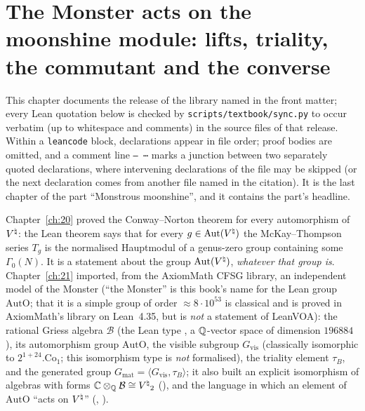 \chapter{The Monster acts on the moonshine module: lifts, triality, the commutant and the converse}\label{ch:22}

\providecommand{\chtwentytwoM}{\mathbb{M}}
\providecommand{\chtwentytwoB}{\mathcal{B}}
\providecommand{\chtwentytwoA}{\mathcal{A}}
\providecommand{\chtwentytwoX}{\mathcal{X}}
\providecommand{\chtwentytwoW}{\mathcal{W}}
\providecommand{\chtwentytwoGvis}{G_{\mathrm{vis}}}
\providecommand{\chtwentytwoGmat}{G_{\mathrm{mat}}}
\providecommand{\chtwentytwoAutO}{\mathrm{AutO}}
\providecommand{\chtwentytwoCo}{\mathrm{Co}}
\providecommand{\chtwentytwoiota}{\iota_{\natural}}
\providecommand{\chtwentytwolean}[1]{\texttt{\directlua{ local s = "\luaescapestring{\detokenize{#1}}" for piece, sep in string.gmatch(s, "([^_.]*)([_.]?)") do if not (piece == "" and sep == "") then tex.sprint(-2, piece .. sep) if not (sep == "") then tex.sprint(string.char(92) .. "allowbreak{}") end end end}}}
\begingroup\setlength{\emergencystretch}{3em}\sloppy

This chapter documents the release of the library named in the front matter; every Lean quotation below is checked by
\texttt{scripts/textbook/sync.py} to occur verbatim (up to whitespace and comments) in the source files of that release.  Within a
\texttt{leancode} block, declarations appear in file order; proof bodies are omitted, and a comment line
\texttt{-- ⋯} marks a junction between two separately quoted declarations, where intervening declarations of the file may be
skipped (or the next declaration comes from another file named in the citation).  It is the
last chapter of the part ``Monstrous moonshine'', and it contains the part's headline.

Chapter~\ref{ch:20} proved the Conway--Norton theorem for every automorphism of ${V^{\natural}}$: the Lean theorem
 says that for every $g\in\operatorname{Aut}({V^{\natural}})$ the McKay--Thompson series
$T_g$ is the normalised Hauptmodul of a genus-zero group containing some $\Gamma_0(N)$.  It is a statement about
the group $\operatorname{Aut}({V^{\natural}})$, \emph{whatever that group is}.  Chapter~\ref{ch:21} imported, from the AxiomMath CFSG
library, an independent model of the Monster (``the Monster'' is this book's name for the Lean group
$\chtwentytwoAutO$; that it is a simple group of order $\approx8\cdot10^{53}$ is classical and is proved in AxiomMath's
library on Lean~4.35, but is \emph{not} a statement of LeanVOA): the rational Griess algebra $\chtwentytwoB$ (the Lean type
, a ${\mathbb{Q}}$-vector space of dimension $196884$), its automorphism group $\chtwentytwoAutO$, the visible
subgroup $\chtwentytwoGvis$ (classically isomorphic to $2^{1+24}.\chtwentytwoCo_1$; this isomorphism type is
\emph{not} formalised), the triality element $\tau_B$, and the generated group
$\chtwentytwoGmat=\langle\chtwentytwoGvis,\tau_B\rangle$; it also built an explicit isomorphism of algebras with forms
$\C\otimes_\Q\chtwentytwoB\cong\Vnat_2$ (), and the language in which an element of
$\chtwentytwoAutO$ ``acts on ${V^{\natural}}$'' (, ).


